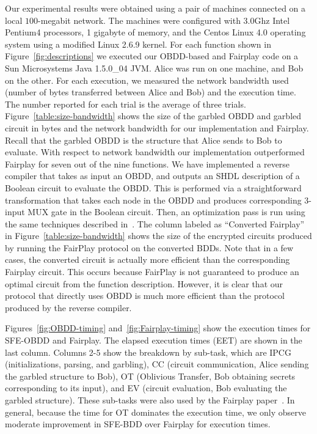 Our experimental results were obtained using a pair of machines
connected on a local $100$-megabit network.  The machines were
configured with 3.0Ghz Intel Pentium4 processors, 1 gigabyte of
memory, and the Centos Linux 4.0 operating system using a modified
Linux 2.6.9 kernel.  For each function shown in
Figure~\ref{fig:descriptions} we executed our OBDD-based and Fairplay
code on a Sun Microsystems Java 1.5.0\_04 JVM. Alice was run on one
machine, and Bob on the other.  For each execution, we measured the
network bandwidth used (number of bytes transferred between Alice and
Bob) and the execution time. The number reported for each trial is the
average of three trials.  Figure~\ref{table:size-bandwidth} shows the
size of the garbled OBDD and garbled circuit in bytes and the network
bandwidth for our implementation and Fairplay. Recall that the
garbled OBDD is the structure that Alice sends to Bob to
evaluate. With respect to network bandwidth our implementation
outperformed Fairplay for seven out of the nine functions. We have
implemented a reverse compiler that takes as input an OBDD, and
outputs an SHDL description of a Boolean circuit to evaluate the OBDD.
This is performed via a straightforward transformation that takes each
node in the OBDD and produces corresponding 3-input MUX gate in the
Boolean circuit.  Then, an optimization pass is run using the same
techniques described in~\cite{Fairplay}.  The column labeled as
``Converted Fairplay'' in Figure~\ref{table:size-bandwidth} shows the size
of the encrypted circuits produced by running the FairPlay protocol on
the converted BDDs.  Note that in a few cases, the converted circuit
is actually more efficient than the corresponding Fairplay circuit.  This occurs
because FairPlay is not guaranteed to produce an optimal circuit from
the function description. However, it is clear that our protocol that
directly uses OBDD is much more efficient than the protocol produced
by the reverse compiler.


Figures~\ref{fig:OBDD-timing}
and~\ref{fig:Fairplay-timing} show the execution times for SFE-OBDD and Fairplay.  The elapsed
execution times (EET) are shown in the last column.  Columns 2-5 show
the breakdown by sub-task, which are IPCG (initializations, parsing,
and garbling), CC (circuit communication, Alice sending the garbled
structure to Bob), OT (Oblivious Transfer, Bob obtaining secrets
corresponding to its input),
and EV (circuit evaluation, Bob evaluating the garbled structure). These sub-tasks were also used by the
Fairplay paper~\cite{Fairplay}. In general, because the time for OT dominates
the execution time, we only observe moderate improvement in SFE-BDD over Fairplay
for execution times. 

